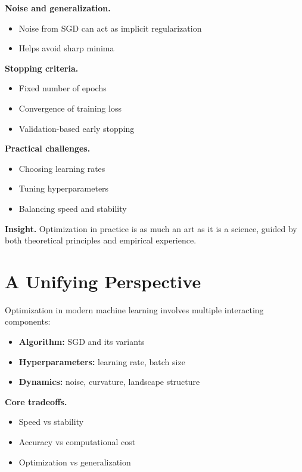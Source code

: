 \medskip

\noindent
\textbf{Noise and generalization.}
\begin{itemize}
    \item Noise from SGD can act as implicit regularization
    \item Helps avoid sharp minima
\end{itemize}

\medskip

\noindent
\textbf{Stopping criteria.}
\begin{itemize}
    \item Fixed number of epochs
    \item Convergence of training loss
    \item Validation-based early stopping
\end{itemize}

\medskip

\noindent
\textbf{Practical challenges.}
\begin{itemize}
    \item Choosing learning rates
    \item Tuning hyperparameters
    \item Balancing speed and stability
\end{itemize}

\medskip

\noindent
\textbf{Insight.}  
Optimization in practice is as much an art as it is a science, guided by both theoretical principles and empirical experience.

\section{A Unifying Perspective}

Optimization in modern machine learning involves multiple interacting components:

\begin{itemize}
    \item \textbf{Algorithm:} SGD and its variants
    \item \textbf{Hyperparameters:} learning rate, batch size
    \item \textbf{Dynamics:} noise, curvature, landscape structure
\end{itemize}

\medskip

\noindent
\textbf{Core tradeoffs.}
\begin{itemize}
    \item Speed vs stability
    \item Accuracy vs computational cost
    \item Optimization vs generalization
\end{itemize}

